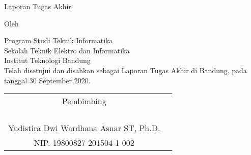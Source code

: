 \clearpage
\pagestyle{empty}

\begin{center}
    \smallskip

    \Large \bfseries \MakeUppercase{\thetitle}
    \vfill

    \Large Laporan Tugas Akhir
    \vfill

    \large Oleh

    \Large \theauthor

    \large Program Studi Teknik Informatika \\
    Sekolah Teknik Elektro dan Informatika \\
    Institut Teknologi Bandung \\

    \vfill
    \normalsize \normalfont
    Telah disetujui dan disahkan sebagai Laporan Tugas Akhir di Bandung, pada tanggal 30 September 2020.

    \vfill
    \setlength{\tabcolsep}{12pt}
    \begin{tabular}{c@{\hskip 0in}c}
        Pembimbing                             \\
         &                                     \\
         &                                     \\
         &                                     \\
         &                                     \\
        Yudistira Dwi Wardhana Asnar ST, Ph.D. \\
        NIP. 19800827 201504 1 002             \\
    \end{tabular}

\end{center}
\clearpage
